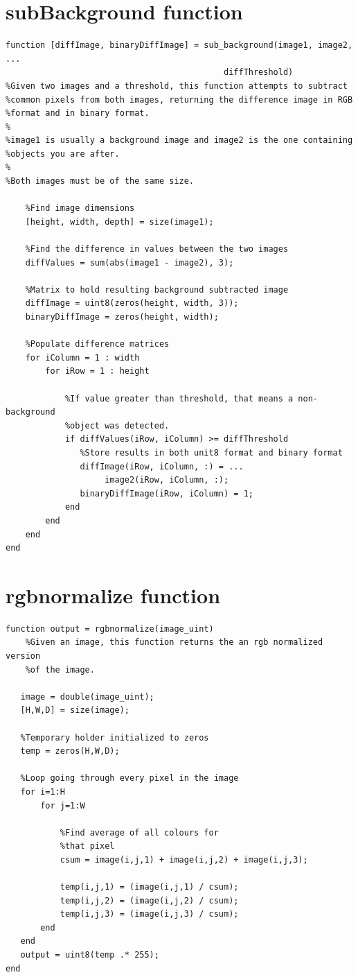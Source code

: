 \documentclass[10pt,a4paper,onecolumn]{report}
\begin{document}
\section{subBackground function}
\begin{lstlisting}
function [diffImage, binaryDiffImage] = sub_background(image1, image2, ...
                                            diffThreshold)
%Given two images and a threshold, this function attempts to subtract 
%common pixels from both images, returning the difference image in RGB 
%format and in binary format.
%
%image1 is usually a background image and image2 is the one containing
%objects you are after.
%
%Both images must be of the same size.
   
    %Find image dimensions
    [height, width, depth] = size(image1);
    
    %Find the difference in values between the two images
    diffValues = sum(abs(image1 - image2), 3);
    
	%Matrix to hold resulting background subtracted image
    diffImage = uint8(zeros(height, width, 3));
    binaryDiffImage = zeros(height, width);
    
    %Populate difference matrices
    for iColumn = 1 : width
        for iRow = 1 : height
            
            %If value greater than threshold, that means a non-background
            %object was detected.
            if diffValues(iRow, iColumn) >= diffThreshold
               %Store results in both unit8 format and binary format
               diffImage(iRow, iColumn, :) = ...
                    image2(iRow, iColumn, :);
               binaryDiffImage(iRow, iColumn) = 1;
            end
        end
    end  
end
\end{lstlisting}

\section{rgbnormalize function}
\begin{lstlisting}
function output = rgbnormalize(image_uint)
    %Given an image, this function returns the an rgb normalized version
    %of the image.
 
   image = double(image_uint);
   [H,W,D] = size(image);
   
   %Temporary holder initialized to zeros
   temp = zeros(H,W,D);
   
   %Loop going through every pixel in the image
   for i=1:H
       for j=1:W
           
           %Find average of all colours for
           %that pixel
           csum = image(i,j,1) + image(i,j,2) + image(i,j,3);
           
           temp(i,j,1) = (image(i,j,1) / csum);
           temp(i,j,2) = (image(i,j,2) / csum);
           temp(i,j,3) = (image(i,j,3) / csum);
       end
   end
   output = uint8(temp .* 255);
end
\end{lstlisting}
\end{document}
